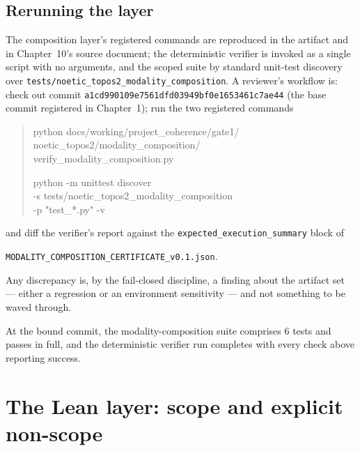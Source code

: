 \subsection{Rerunning the layer}
\label{ch11:sec:rerun}

The composition layer's registered commands are reproduced in the
artifact and in Chapter~10's source document; the deterministic verifier
is invoked as a single script with no arguments, and the scoped suite by
standard unit-test discovery over
\texttt{tests/noetic\_topos2\_modality\_composition}. A reviewer's
workflow is: check out commit
\texttt{a1cd990109e7561dfd03949bf0e1653461c7ae44} (the base commit
registered in Chapter~1); run the two registered commands

\begin{quote}
\ttfamily\small
python docs/working/project\_coherence/gate1/\\
\hspace*{1em}noetic\_topos2/modality\_composition/\\
\hspace*{1em}verify\_modality\_composition.py

python -m unittest discover\\
\hspace*{1em}-s tests/noetic\_topos2\_modality\_composition\\
\hspace*{1em}-p "test\_*.py" -v
\end{quote}

\noindent and diff the verifier's report against the
\texttt{expected\_execution\_summary} block of
\begin{center}
\texttt{MODALITY\_COMPOSITION\_CERTIFICATE\_v0.1.json}.
\end{center}
Any discrepancy
is, by the fail-closed discipline, a finding about the artifact set ---
either a regression or an environment sensitivity --- and not something
to be waved through.

\begin{finding}
\label{ch11:fnd:compsuite}
At the bound commit, the modality-composition suite comprises $6$ tests and
passes in full, and the deterministic verifier run completes with every
check above reporting success.
\end{finding}

\section{The Lean layer: scope and explicit non-scope}
\label{ch11:sec:lean}

